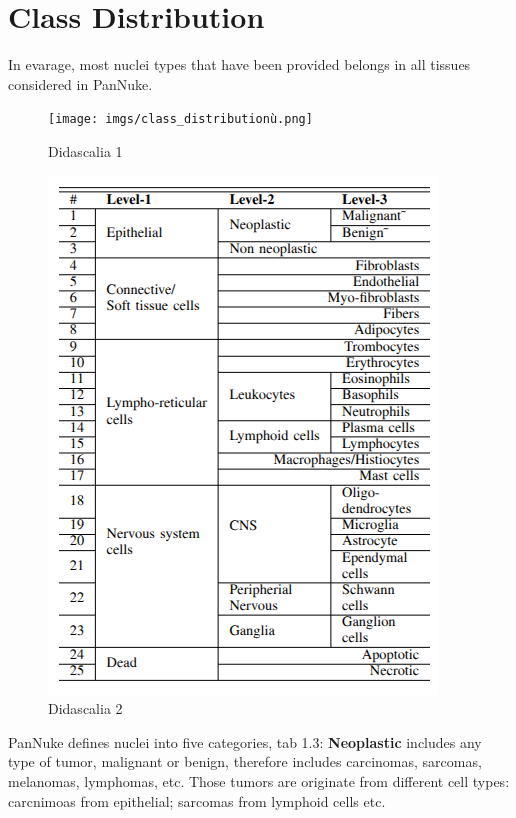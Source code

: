 \documentclass[target=bach,aauheader=,style=]{thud}
\begin{document}
\section{Class Distribution}
\label{sec:classdistribution}
In evarage, most nuclei types that have been provided belongs in all tissues considered in PanNuke.
\begin{figure}[h]
  \centering
  \begin{minipage}{0.45\textwidth}
    \centering
    \texttt{[image: imgs/class\_distributionù.png]}
    \caption{Didascalia 1}
  \end{minipage}\hspace{2cm}
  \begin{minipage}{0.3\textwidth}
    \centering
    \includegraphics[width=\linewidth]{imgs/class_tab.png}
    \caption{Didascalia 2}
  \end{minipage}
\end{figure}
PanNuke defines nuclei into five categories, tab 1.3: \textbf{Neoplastic} includes any type of tumor, malignant or benign, therefore includes carcinomas, sarcomas, melanomas, lymphomas, etc. Those tumors are originate from different cell types: carcnimoas from epithelial; sarcomas from lymphoid cells etc.\\
\end{document}
